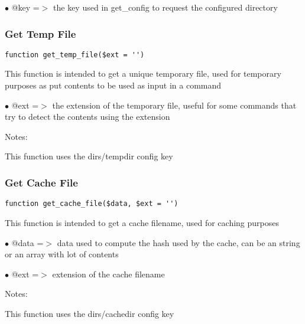 \documentclass[a4paper]{article}
\begin{document}
\begin{compactitem}
\item[\color{myblue}$\bullet$] @key =$>$ the key used in get\_config to request the configured directory
\end{compactitem}

\hypertarget{toc129}{}
\subsubsection{Get Temp File}

\begin{lstlisting}
function get_temp_file($ext = '')
\end{lstlisting}

This function is intended to get a unique temporary file, used for temporary
purposes as put contents to be used as input in a command

\begin{compactitem}
\item[\color{myblue}$\bullet$] @ext =$>$ the extension of the temporary file, useful for some commands that
        try to detect the contents using the extension
\end{compactitem}

Notes:

This function uses the dirs/tempdir config key

\hypertarget{toc130}{}
\subsubsection{Get Cache File}

\begin{lstlisting}
function get_cache_file($data, $ext = '')
\end{lstlisting}

This function is intended to get a cache filename, used for caching purposes

\begin{compactitem}
\item[\color{myblue}$\bullet$] @data =$>$ data used to compute the hash used by the cache, can be an string or
         an array with lot of contents
\item[\color{myblue}$\bullet$] @ext  =$>$ extension of the cache filename
\end{compactitem}

Notes:

This function uses the dirs/cachedir config key

\hypertarget{toc131}{}
\end{document}
